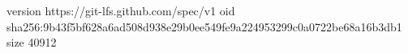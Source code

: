 version https://git-lfs.github.com/spec/v1
oid sha256:9b43f5bf628a6ad508d938e29b0ee549fe9a224953299c0a0722be68a16b3db1
size 40912
